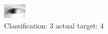 \begin{figure}[h!]
\begin{center}
\includegraphics[width=0.60\columnwidth]{figures/ID2502_class_3_target_4.png}
\end{center}
\caption{ Classification: 3 actual target: 4}
\label{fig:ID2502_class_3_target_4}
\end{figure}
